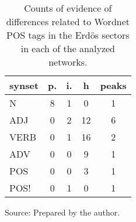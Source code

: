 \begin{table}[h!]
\begin{center}
\caption{Counts of evidence of differences related to Wordnet POS tags in the Erd\"os sectors in each of the analyzed networks.}
\begin{tabular}{| l || c | c | c || c |}\hline
{\bf synset} & {\bf p.} & {\bf i.} & {\bf h} & {\bf peaks} \\\hline\hline
N & 8  & 1  & 0  & 1 \\\hline
ADJ & 0  & 2  & 12  & 6 \\\hline
VERB & 0  & 1  & 16  & 2 \\\hline
ADV & 0  & 0  & 9  & 1 \\\hline\hline
POS & 0  & 0  & 3  & 1 \\\hline
POS! & 0  & 1  & 0  & 1 \\\hline
\end{tabular}
\begin{flushleft}
		Source: Prepared by the author.\
\end{flushleft}
\end{center}
\end{table}
